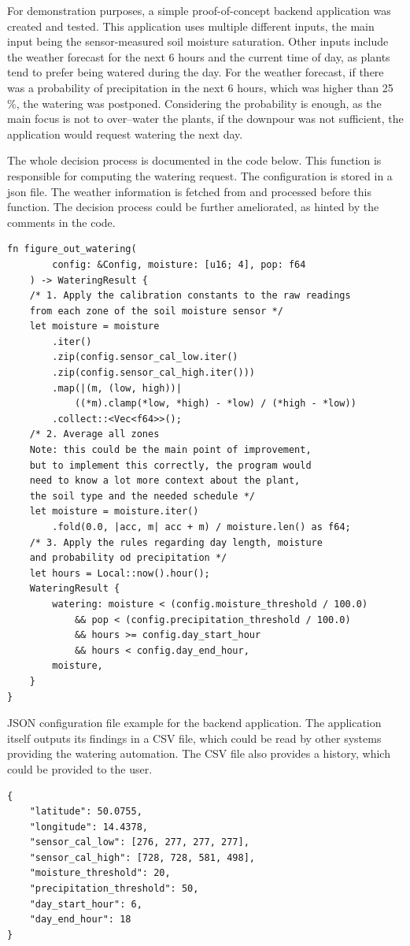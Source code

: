 For demonstration purposes, a simple proof-of-concept backend application was created and tested. This application uses multiple different inputs, the main input being the sensor-measured soil moisture saturation. Other inputs include the weather forecast for the next 6 hours and the current time of day, as plants tend to prefer being watered during the day. For the weather forecast, if there was a probability of precipitation in the next 6 hours, which was higher than 25 \%, the watering was postponed.
Considering the probability is enough, as the main focus is not to over--water the plants, if the downpour was not sufficient, the application would request watering the next day.

The whole decision process is documented in the code below. This function is responsible for computing the watering request. The configuration is stored in a json file. The weather information is fetched from  and processed before this function. The decision process could be further ameliorated, as hinted by the comments in the code.
\newpage
\begin{lstlisting}
fn figure_out_watering(
        config: &Config, moisture: [u16; 4], pop: f64
    ) -> WateringResult {
    /* 1. Apply the calibration constants to the raw readings
    from each zone of the soil moisture sensor */
    let moisture = moisture
        .iter()
        .zip(config.sensor_cal_low.iter()
        .zip(config.sensor_cal_high.iter()))
        .map(|(m, (low, high))| 
            ((*m).clamp(*low, *high) - *low) / (*high - *low))
        .collect::<Vec<f64>>();
    /* 2. Average all zones
    Note: this could be the main point of improvement,
    but to implement this correctly, the program would
    need to know a lot more context about the plant,
    the soil type and the needed schedule */
    let moisture = moisture.iter()
        .fold(0.0, |acc, m| acc + m) / moisture.len() as f64;
    /* 3. Apply the rules regarding day length, moisture
    and probability od precipitation */
    let hours = Local::now().hour();
    WateringResult {
        watering: moisture < (config.moisture_threshold / 100.0)
            && pop < (config.precipitation_threshold / 100.0)
            && hours >= config.day_start_hour 
            && hours < config.day_end_hour,
        moisture,
    }
}
\end{lstlisting}
JSON configuration file example for the backend application. The application itself outputs its findings in a CSV file, which could be read by other systems providing the watering automation. The CSV file also provides a history, which could be provided to the user.
\begin{lstlisting}
{
    "latitude": 50.0755,
    "longitude": 14.4378,
    "sensor_cal_low": [276, 277, 277, 277],
    "sensor_cal_high": [728, 728, 581, 498],
    "moisture_threshold": 20,
    "precipitation_threshold": 50,
    "day_start_hour": 6,
    "day_end_hour": 18
}
\end{lstlisting}
